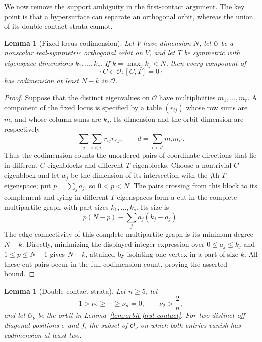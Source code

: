 \documentclass[11pt,reqno]{amsart}
\newtheorem{lemma}[theorem]{Lemma}
\theoremstyle{definition}
\theoremstyle{remark}
\begin{document}
We now remove the support ambiguity in the first-contact argument.  The key
point is that a hypersurface can separate an orthogonal orbit, whereas the
union of its double-contact strata cannot.

\begin{lemma}[Fixed-locus codimension]
\label{lem:fixed-locus-codim}
Let $V$ have dimension $N$, let $\mathcal O$ be a nonscalar real-symmetric
orthogonal orbit on $V$, and let $T$ be symmetric with eigenspace dimensions
$k_1,\ldots,k_s$.  If $k=\max_jk_j<N$, then every component of
\[
 \{C\in\mathcal O:[C,T]=0\}
\]
has codimension at least $N-k$ in $\mathcal O$.
\end{lemma}

\begin{proof}
Suppose that the distinct eigenvalues on $\mathcal O$ have multiplicities
$m_1,\ldots,m_r$.  A component of the fixed locus is specified by a table
$(r_{ij})$ whose row sums are $m_i$ and whose column sums are $k_j$.  Its
dimension and the orbit dimension are respectively
\[
 \sum_j\sum_{i<i'}r_{ij}r_{i'j},
 \qquad
 d=\sum_{i<i'}m_im_{i'}.
\]
Thus the codimension counts the unordered pairs of coordinate directions
that lie in different $C$-eigenblocks and different $T$-eigenblocks.
Choose a nontrivial $C$-eigenblock and let $a_j$ be the dimension of its
intersection with the $j$th $T$-eigenspace; put $p=\sum_ja_j$, so
$0<p<N$.  The pairs crossing from this block to its complement and lying in
different $T$-eigenspaces form a cut in the complete multipartite graph with
part sizes $k_1,\ldots,k_s$.  Its size is
\[
 p(N-p)-\sum_j a_j(k_j-a_j).
\]
The edge connectivity of this complete multipartite graph is its minimum
degree $N-k$.  Directly, minimizing the displayed integer expression over
$0\le a_j\le k_j$ and $1\le p\le N-1$ gives $N-k$, attained by isolating
one vertex in a part of size $k$.  All these cut pairs occur in the full
codimension count, proving the asserted bound.
\end{proof}

\begin{lemma}[Double-contact strata]
\label{lem:double-contact}
Let $n\ge5$, let
\[
 1>\nu_2\ge\cdots\ge\nu_n=0,
 \qquad \nu_2>\frac2n,
\]
and let $\mathcal O_\nu$ be the orbit in
Lemma~\ref{lem:orbit-first-contact}.  For two distinct off-diagonal positions
$e$ and $f$, the subset of $\mathcal O_\nu$ on which both entries vanish has
codimension at least two.
\end{lemma}
\end{document}
